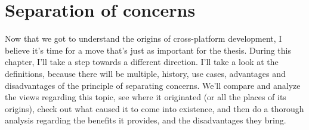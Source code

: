 \chapter{Separation of concerns}
Now that we got to understand the origins of cross-platform development, I believe it's time for a move that's just as important for the thesis.
During this chapter, I'll take a step towards a different direction.
I'll take a look at the definitions, because there will be multiple, history, use cases, advantages and disadvantages of the principle of separating concerns.
We'll compare and analyze the views regarding this topic, see where it originated (or all the places of its origins), 
check out what caused it to come into existence, and then do a thorough analysis regarding the benefits it provides, and the disadvantages they bring.


